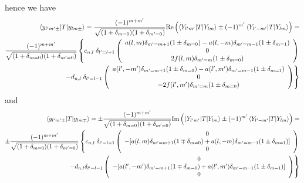\documentclass[aps,prb,floatfix,epsfig,singlecolumn,showpacs,preprintnumbers]{revtex4}
\renewcommand{\Im}{\textrm{Im}}
\renewcommand{\Re}{\textrm{Re}}
\begin{document}
hence we have
\begin{eqnarray}
\braket{y_{l'm'\pm}|T|y_{lm\pm}}  =\frac{(-1)^{m+m'}}{\sqrt{(1+\delta_{m=0})(1+\delta_{m'=0})}} 
\Re\left(\braket{Y_{l' m'}|T|Y_{lm}}\pm (-1)^{m'}\braket{Y_{l' -m'}|T|Y_{lm}}\right)=\nonumber\\
\frac{(-1)^{m+m'}}{\sqrt{(1+\delta_{m=0})(1+\delta_{m'=0})}} 
\left\{
c_{n,l}\;\delta_{l'=l+1}
\left(
\begin{array}{c}
a(l,m) \delta_{m'=m+1}(1\pm\delta_{m=0})-  a(l,-m)\delta_{m'=m-1}(1\pm\delta_{m=1}) \\
0\\
2 f(l,m)\delta_{m'=m} (1\pm\delta_{m=0})
\end{array}
\right)
%
\right.
\nonumber\\
\left.
%
-d_{n,l}\;\delta_{l'=l-1}
\left(
\begin{array}{c}
a(l',-m')\delta_{m'=m+1}(1\pm\delta_{m=0})-a(l',m')\delta_{m'=m-1}(1\pm\delta_{m=1})\\
0\\
-2 f(l',m')\delta_{m'=m}(1\pm\delta_{m=0})
\end{array}
\right)
\right\}
\end{eqnarray}
and
\begin{eqnarray}
\braket{y_{l'm'\pm}|T|y_{lm\mp}}  =\pm\frac{(-1)^{m+m'}}{\sqrt{(1+\delta_{m=0})(1+\delta_{m'=0})}} 
\Im\left(\braket{Y_{l' m'}|T|Y_{lm}}\pm (-1)^{m'}\braket{Y_{l' -m'}|T|Y_{lm}}\right)=\nonumber\\
\pm\frac{(-1)^{m+m'}}{\sqrt{(1+\delta_{m=0})(1+\delta_{m'=0})}} 
\left\{
c_{n,l}\;\delta_{l'=l+1}
\left(
\begin{array}{c}
0\\
-[  a(l,m)\delta_{m'=m+1}(1\mp\delta_{m=0})+a(l,-m)\delta_{m'=m-1}(1\pm\delta_{m=1})]  \\
0
\end{array}
\right)
\right.
%
\nonumber\\
%
\left.
-d_{n,l}
\delta_{l'=l-1}
\left(
\begin{array}{c}
0\\
-[a(l',-m')\delta_{m'=m+1}(1\mp\delta_{m=0})+a(l',m')\delta_{m'=m-1}(1\pm\delta_{m=1})] \\
0
\end{array}
\right)
\right\}
\end{eqnarray}
\end{document}
